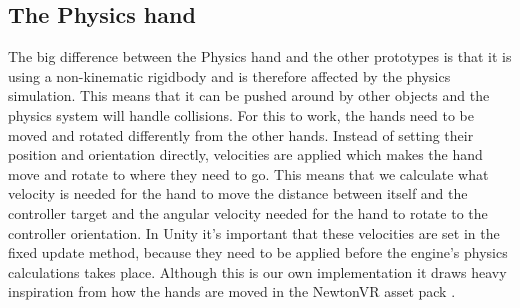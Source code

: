 \subsection{The Physics hand}
\label{subsec:physicsHand}
The big difference between the Physics hand and the other prototypes is that it is using a non-kinematic rigidbody and is therefore affected by the physics simulation. This means that it can be pushed around by other objects and the physics system will handle collisions. For this to work, the hands need to be moved and rotated differently from the other hands. Instead of setting their position and orientation directly, velocities are applied which makes the hand move and rotate to where they need to go. This means that we calculate what velocity is needed for the hand to move the distance between itself and the controller target and the angular velocity needed for the hand to rotate to the controller orientation. In Unity it's important that these velocities are set in the fixed update method, because they need to be applied before the engine's physics calculations takes place. Although this is our own implementation it draws heavy inspiration from how the hands are moved in the NewtonVR asset pack \parencite{TomorrowTodayLabs2016}.

